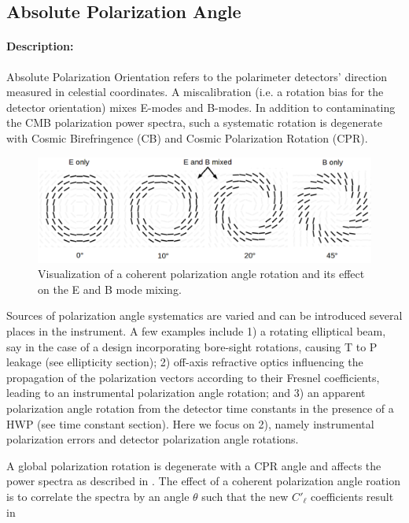 \subsection{Absolute Polarization Angle}

\paragraph{Description:}
Absolute Polarization Orientation refers to the polarimeter detectors'
direction measured in celestial coordinates. A miscalibration (i.e. a rotation
bias for the detector orientation) mixes E-modes and B-modes. In addition to
contaminating the CMB polarization power spectra, such a systematic rotation is
degenerate with Cosmic Birefringence (CB) and Cosmic Polarization Rotation
(CPR).

\begin{figure}
\centering
\includegraphics[width=\textwidth]{figures/ebmixing.png}
\caption{Visualization of a coherent polarization angle rotation and its effect on the E and B mode mixing.
}\label{fig:ebmixing}
\end{figure}

Sources of polarization angle systematics are varied and can be introduced
several places in the instrument. A few examples include 1) a rotating
elliptical beam, say in the case of a design incorporating bore-sight
rotations, causing T to P leakage (see ellipticity section); 2) off-axis
refractive optics influencing the propagation of the polarization vectors
according to their Fresnel coefficients, leading to an instrumental
polarization angle rotation; and 3) an apparent polarization angle rotation
from the detector time constants in the presence of a HWP (see time constant
section). Here we focus on 2), namely instrumental polarization errors and
detector polarization angle rotations.


A global polarization rotation is degenerate with a CPR angle and affects the
power spectra as described in \cite{Pagano2009, Keating2013}. 
The effect of a coherent polarization angle roation is to correlate the spectra by an angle $\theta$ such that the new $C'_{\ell}$ coefficients result in

